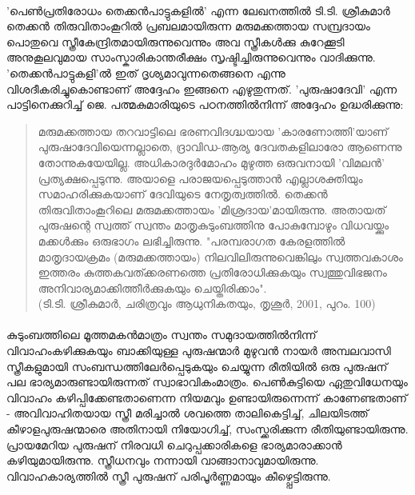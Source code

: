 \label{ch2box3} %
\begin{tcolorbox}[%
  breakable, %
  arc=0mm, 
  left=1pt, right = 1pt, 
  boxrule=0mm,
  colback = {blue!10}, %
] 

\paragraph{}'പെൺപ്രതിരോധം തെക്കൻപാട്ടുകളിൽ' എന്ന ലേഖനത്തിൽ ടി.ടി. ശ്രീകുമാർ തെക്കൻ തിരുവിതാംകൂറിൽ പ്രബലമായിരുന്ന മരുമക്കത്തായ സമ്പ്രദായം പൊതുവെ സ്ത്രീകേന്ദ്രിതമായിരുന്നുവെന്നും അവ സ്ത്രീകൾക്കു കുറേക്കൂടി അനുകൂലവുമായ സാംസ്കാരികാന്തരീക്ഷം സൃഷ്ടിച്ചിരുന്നുവെന്നും വാദിക്കുന്നു. 'തെക്കൻപാട്ടുകളി'ൽ ഇത് ദൃശ്യമാവുന്നതെങ്ങനെ എന്നു വിശദീകരിച്ചുകൊണ്ടാണ് അദ്ദേഹം ഇങ്ങനെ എഴുതുന്നത്. 'പുരുഷാദേവി' എന്ന പാട്ടിനെക്കുറിച്ച് ജെ. പത്മകുമാരിയുടെ പഠനത്തിൽനിന്ന് അദ്ദേഹം ഉദ്ധരിക്കുന്നു:
\begin{quotation}
 മരുമക്കത്തായ തറവാട്ടിലെ ഭരണവിദഗ്ദ്ധയായ 'കാരണോത്തി'യാണ് പുരുഷാദേവിയെന്നല്ലാതെ, ദ്രാവിഡ-ആര്യ ദേവതകളിലാരോ ആണെന്നു തോന്നുകയേയില്ല. അധികാരദുർമോഹം മുഴുത്ത ഒരുവനായി 'വിമലൻ' പ്രത്യക്ഷപ്പെടുന്നു. അയാളെ പരാജയപ്പെടുത്താൻ എല്ലാശക്തിയും സമാഹരിക്കുകയാണ് ദേവിയുടെ നേതൃത്വത്തിൽ. തെക്കൻ തിരുവിതാംകൂറിലെ മരുമക്കത്തായം 'മിശ്രദായ'മായിരുന്നു. അതായത് പുരുഷന്റെ സ്വത്ത് സ്വന്തം മാതൃകുടുംബത്തിനു പോകുമ്പോഴും വിധവയ്ക്കും മക്കൾക്കും ഒരുഭാഗം ലഭിച്ചിരുന്നു. "പരമ്പരാഗത കേരളത്തിൽ മാതൃദായക്രമം (മരുമക്കത്തായം) നിലവിലിരുന്നുവെങ്കിലും സ്വത്തവകാശം ഇത്തരം കുത്തകവത്ക്കരണത്തെ പ്രതിരോധിക്കുകയും സ്വത്തുവിഭജനം അനിവാര്യമാക്കിത്തീർക്കുകയും ചെയ്തിരിക്കാം".\\(ടി.ടി. ശ്രീകുമാർ, ചരിത്രവും ആധുനികതയും, തൃശൂർ, 2001, പുറം. 100)
 \end{quotation}

\end{tcolorbox}

\paragraph{}കുടുംബത്തിലെ മൂത്തമകൻമാത്രം സ്വന്തം സമുദായത്തിൽനിന്ന് വിവാഹംകഴിക്കുകയും ബാക്കിയുള്ള പുരുഷന്മാർ മുഴുവൻ നായർ അമ്പലവാസി സ്ത്രീകളുമായി സംബന്ധത്തിലേർപ്പെടുകയും ചെയ്യുന്ന രീതിയിൽ ഒരു പുരുഷന് പല ഭാര്യമാരുണ്ടായിരുന്നത് സ്വാഭാവികംമാത്രം. പെൺകുട്ടിയെ ഏതുവിധേനയും വിവാഹം കഴിപ്പിക്കേണ്ടതാണെന്ന നിയമവും ഉണ്ടായിരുന്നെന്ന് കാണേണ്ടതാണ് - അവിവാഹിതയായ സ്ത്രീ മരിച്ചാൽ ശവത്തെ താലികെട്ടിച്ച്, ചിലയിടത്ത് കീഴാളപുരുഷന്മാരെ അതിനായി നിയോഗിച്ച്, സംസ്ക്കരിക്കുന്ന രീതിയുണ്ടായിരുന്നു. പ്രായമേറിയ പുരുഷന് നിരവധി ചെറുപ്പക്കാരികളെ ഭാര്യമാരാക്കാൻ കഴിയുമായിരുന്നു. സ്ത്രീധനവും നന്നായി വാങ്ങാനാവുമായിരുന്നു. വിവാഹകാര്യത്തിൽ സ്ത്രീ പുരുഷന് പരിപൂർണ്ണമായും കീഴ്പ്പെട്ടിരുന്നു.

